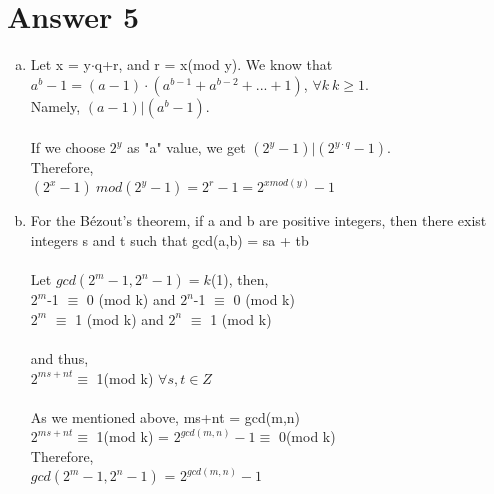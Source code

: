 \documentclass[11pt]{article}
\begin{document}
\section*{Answer 5}
    \begin{enumerate}[(a)]
        \item Let x = y$\cdot$q+r, and r = x(mod y). We know that $a^b-1 = (a-1)\cdot(a^{b-1}+a^{b-2}+...+1)$, $\forall k\: k\geq 1$.\\
        Namely, $(a-1)|(a^b-1)$.\\\\
        If we choose $2^y$ as "a" value, we get $(2^y-1)|(2^{y\cdot q}-1)$.\\
        Therefore,\\
        $(2^x-1)\: mod(2^y-1) = 2^r-1 = 2^{x mod(y)}-1$\\
            
        \item For the Bézout’s theorem, if a and b are positive integers, then there exist integers s and t such that gcd(a,b) = sa + tb\\
        \\
        Let $gcd(2^m-1,2^n-1) = k$\:\:\:(1), then,\\
        $2^m$-1 $\equiv$ 0 (mod k) and $2^n$-1 $\equiv$ 0 (mod k)\\
        $2^m$ $\equiv$ 1 (mod k) and $2^n$ $\equiv$ 1 (mod k)\\\\
        and thus,\\
        $2^{ms+nt} \equiv$ 1(mod k) \:\:\: $\forall s,t \in Z$\\\\
        As we mentioned above, ms+nt = gcd(m,n)\\
        $2^{ms+nt} \equiv$ 1(mod k) = $2^{gcd(m,n)} - 1 \equiv$ 0(mod k) \\Therefore, \\
        $gcd(2^m-1,2^n-1)$ = $2^{gcd(m,n)} - 1$\\
            

    \end{enumerate}
\end{document}
